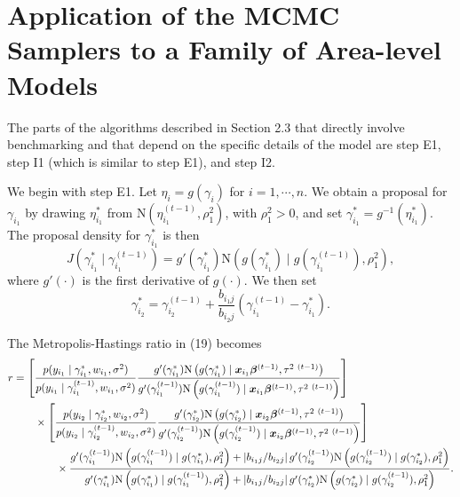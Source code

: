 \documentclass[12pt]{article}
\begin{document}
\section{Application of the MCMC Samplers to a Family of Area-level Models}

The parts of the algorithms described in Section 2.3 that directly involve benchmarking and that depend on the specific details of the model are step E1, step I1 (which is similar to step E1), and step I2.

We begin with step E1. Let $\eta_{i}=g(\gamma_{i})$ for $i=1,\cdots,n$.  We obtain a proposal for $\gamma_{i_1}$ by drawing $\eta_{i_1}^*$ from $\text{N}(\eta_{i_1}^{(t-1)},\rho_1^2)$, with $\rho_1^2>0$, and set $\gamma_{i_1}^*=g^{-1}(\eta_{i_1}^*)$.  The proposal density for $\gamma_{i_1}^*$ is then
\begin{equation}
  J(\gamma_{i_1}^* \mid \gamma_{i_1}^{(t-1)}) = g'(\gamma_{i_1}^*)\text{N}\left(g(\gamma_{i_1}^*) \mid  g(\gamma_{i_1}^{(t-1)}), \rho_1^2 \right),
\end{equation}
where $g'(\cdot)$ is the first derivative of $g(\cdot)$.
We then set
\begin{equation}
  \gamma_{i_2}^* = \gamma_{i_2}^{(t-1)}+\frac{b_{i_1j}}{b_{i_2j}}\left( \gamma_{i_1}^{(t-1)} - \gamma_{i_1}^* \right).
\end{equation}

The Metropolis-Hastings ratio in (19) becomes
\begin{align}\label{eq:aratio_E1_specific}
  r & = \left[\frac{ p(y_{i_1} \mid \gamma_{i_1}^*, w_{i_1}, \sigma^2 )}  { p(y_{i_1} \mid \gamma_{i_1}^{(t-1)}, w_{i_1}, \sigma^2 ) } \frac{ g'(\gamma_{i_1}^*)\text{N}\left(g(\gamma_{i_1}^*) \mid \bm{x}_{i_1}\bm{\beta}^{(t-1)}, \tau^{2\ (t-1)} \right)} { g'(\gamma_{i_1}^{(t-1)})\text{N}\left(g(\gamma_{i_1}^{(t-1)}) \mid \bm{x}_{i_1}\bm{\beta}^{(t-1)}, \tau^{2\ (t-1)} \right) }\right] \notag \\
  & \quad \quad \times \left[\frac{ p(y_{i_2} \mid \gamma_{i_2}^*, w_{i_2}, \sigma^2 )}  { p(y_{i_2} \mid \gamma_{i_2}^{(t-1)}, w_{i_2}, \sigma^2 ) } \frac{ g'(\gamma_{i_2}^*)\text{N}\left(g(\gamma_{i_2}^*) \mid \bm{x}_{i_2}\bm{\beta}^{(t-1)}, \tau^{2\ (t-1)} \right)} { g'(\gamma_{i_2}^{(t-1)})\text{N}\left(g(\gamma_{i_2}^{(t-1)}) \mid \bm{x}_{i_2}\bm{\beta}^{(t-1)}, \tau^{2\ (t-1)} \right) }\right]\notag\\
  & \quad \quad \quad \quad \times \frac{ g'(\gamma_{i_1}^{(t-1)})\text{N}\left(g(\gamma_{i_1}^{(t-1)}) \mid  g(\gamma_{i_1}^*), \rho_1^2 \right) +  \left|b_{i_1j}/b_{i_2j}\right|g'(\gamma_{i_2}^{(t-1)})\text{N}\left(g(\gamma_{i_2}^{(t-1)}) \mid  g(\gamma_{i_2}^*), \rho_1^2 \right)}
  {g'(\gamma_{i_1}^*)\text{N}\left(g(\gamma_{i_1}^*) \mid  g(\gamma_{i_1}^{(t-1)}), \rho_1^2 \right) +  \left|b_{i_1j}/b_{i_2j}\right|g'(\gamma_{i_2}^*)\text{N}\left(g(\gamma_{i_2}^*) \mid  g(\gamma_{i_2}^{(t-1)}), \rho_1^2 \right)}.
\end{align}
\end{document}
